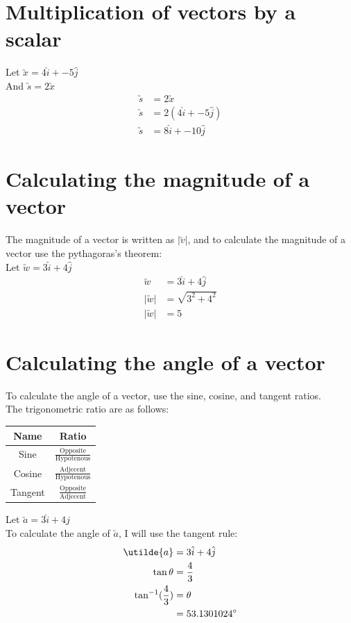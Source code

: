 \documentclass{book}
\begin{document}
\section{Multiplication of vectors by a scalar}
Let $\utilde{x} = 4\hat{i} + -5\hat{j}$\\
And $\utilde{s} = 2\utilde{x}$
\begin{align*}
	\utilde{s} & = 2\utilde{x}             \\
	\utilde{s} & = 2(4\hat{i} + -5\hat{j}) \\
	\utilde{s} & = 8\hat{i} + -10\hat{j}
\end{align*}

\section{Calculating the magnitude of a vector}
The magnitude of a vector is written as $|\utilde{v}|$, and to calculate the magnitude of a vector use the pythagoras's theorem:\\

Let $\utilde{w} = 3\hat{i} + 4\hat{j}$
\begin{align*}
	\utilde{w}   & = 3\hat{i} + 4\hat{j}  \\
	|\utilde{w}| & = \sqrt{{3}^2 + {4}^2} \\
	|\utilde{w}| & = 5
\end{align*}


\section{Calculating the angle of a vector}
To calculate the angle of a vector, use the sine, cosine, and tangent ratios.\\

The trigonometric ratio are as follows:
\begin{center}
	\begin{tabular}{c|c}
		Name    & Ratio                                       \\ \hline
		Sine    & $\frac{\text{Opposite}}{\text{Hypotenous}}$ \\
		Cosine  & $\frac{\text{Adjecent}}{\text{Hypotenous}}$ \\
		Tangent & $\frac{\text{Opposite}}{\text{Adjecent}}$
	\end{tabular}
\end{center}


Let $\utilde{a} = 3\hat{i} + 4\hat{j}$\\
To calculate the angle of $\utilde{a}$, I will use the tangent rule:
\begin{align*}
	\utilde{a}             & = 3\hat{i} + 4\hat{j} \\
	\tan\theta             & = \frac{4}{3}         \\
	\tan^{-1}(\frac{4}{3}) & = \theta              \\
	                       & = 53.1301024\degree
\end{align*}
\end{document}
